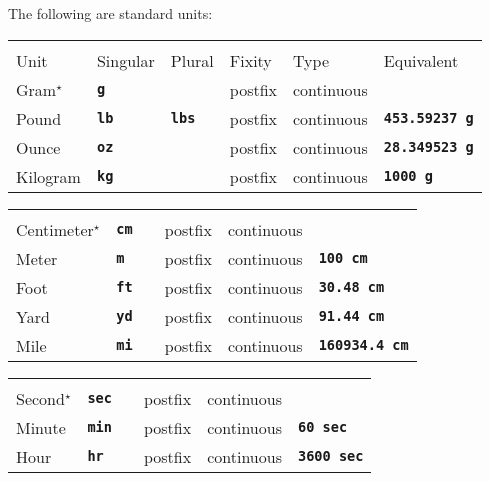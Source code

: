 \documentclass[12pt]{article}
\newcommand{\TT}[1]{{\tt \bfseries #1}}
\newcommand{\STAR}{{\Large $^\star$}}
\begin{document}
The following are standard units:

\newcommand{\BU}{\STAR{}}

\hspace*{0.2in}\begin{tabular}{llllll}
\hspace*{1.0in} & \hspace*{0.8in} & \hspace*{0.8in} & \hspace*{0.4in} &
                  \hspace*{0.7in} \\[-2ex]

Unit		& Singular & Plural & Fixity & Type & Equivalent
\\[2ex]
Gram\BU		& \TT{g} & & postfix & continuous \\
Pound		& \TT{lb} & \TT{lbs} & postfix & continuous
                                               & \TT{453.59237 g} \\
Ounce		& \TT{oz} &          & postfix & continuous
                                               & \TT{28.349523 g} \\
Kilogram	& \TT{kg} & & postfix & continuous & \TT{1000 g} \\
\end{tabular}

\hspace*{0.2in}\begin{tabular}{llllll}
\hspace*{1.0in} & \hspace*{0.8in} & \hspace*{0.8in} & \hspace*{0.4in} &
                  \hspace*{0.7in} \\[-2ex]
Centimeter\BU	& \TT{cm} & & postfix & continuous \\
Meter		& \TT{m}  & & postfix & continuous & \TT{100 cm} \\
Foot		& \TT{ft} & & postfix & continuous & \TT{30.48 cm} \\
Yard		& \TT{yd} & & postfix & continuous & \TT{91.44 cm} \\
Mile		& \TT{mi} & & postfix & continuous & \TT{160934.4 cm} \\
\end{tabular}

\hspace*{0.2in}\begin{tabular}{llllll}
\hspace*{1.0in} & \hspace*{0.8in} & \hspace*{0.8in} & \hspace*{0.4in} &
                  \hspace*{0.7in} \\[-2ex]
Second\BU	& \TT{sec} & & postfix & continuous \\
Minute		& \TT{min} & & postfix & continuous & \TT{60 sec} \\
Hour		& \TT{hr} & & postfix & continuous & \TT{3600 sec} \\
\end{tabular}
\end{document}

